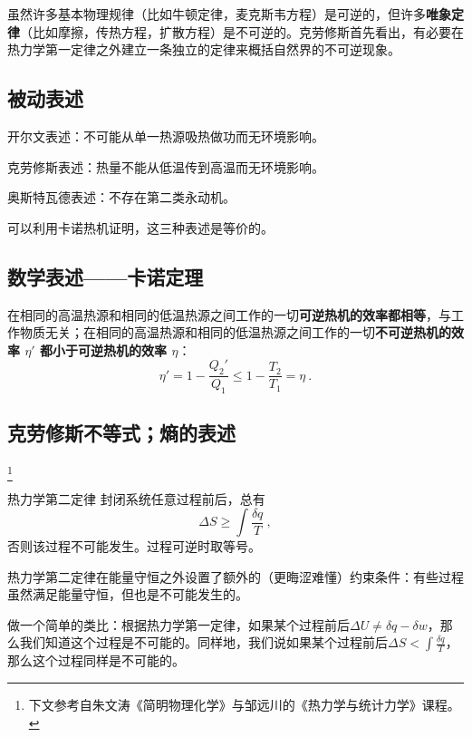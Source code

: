 
\begin{issues}
\issueDraft
\end{issues}


虽然许多基本物理规律（比如牛顿定律，麦克斯韦方程）是可逆的，但许多\textbf{唯象定律}（比如摩擦，传热方程，扩散方程）是不可逆的。克劳修斯首先看出，有必要在热力学第一定律之外建立一条独立的定律来概括自然界的不可逆现象。

\subsection{被动表述}
开尔文表述：不可能从单一热源吸热做功而无环境影响。

克劳修斯表述：热量不能从低温传到高温而无环境影响。

奥斯特瓦德表述：不存在第二类永动机。

可以利用卡诺热机证明，这三种表述是等价的。

\subsection{数学表述——卡诺定理}

在相同的高温热源和相同的低温热源之间工作的一切\textbf{可逆热机的效率都相等}，与工作物质无关；在相同的高温热源和相同的低温热源之间工作的一切\textbf{不可逆热机的效率 $\eta'$ 都小于可逆热机的效率 $\eta$}：
\begin{equation}
\eta'=1-\frac{Q_2'}{Q_1}\le 1-\frac{T_2}{T_1}=\eta~.
\end{equation}

\subsection{克劳修斯不等式；熵的表述}
\footnote{下文参考自朱文涛《简明物理化学》与邹远川的《热力学与统计力学》课程。}

\begin{theorem}{热力学第二定律}
封闭系统任意过程前后，总有
\begin{equation}
\Delta S \ge \int \frac{\delta q}{T}~,
\end{equation}
否则该过程不可能发生。过程可逆时取等号。
\end{theorem}
热力学第二定律在能量守恒之外设置了额外的（更晦涩难懂）约束条件：有些过程虽然满足能量守恒，但也是不可能发生的。

做一个简单的类比：根据热力学第一定律，如果某个过程前后$\Delta U \ne \delta q - \delta w$，那么我们知道这个过程是不可能的。同样地，我们说如果某个过程前后$\Delta S < \int \frac{\delta q}{T}$，那么这个过程同样是不可能的。

